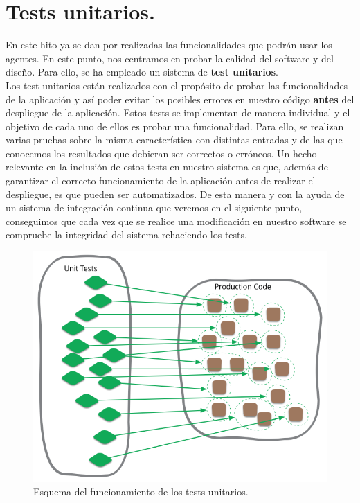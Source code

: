 \section{Tests unitarios.}\label{tests-section}

En este hito ya se dan por realizadas las funcionalidades que podrán usar los agentes. En este punto, nos centramos en probar la calidad del software y del diseño.
Para ello, se ha empleado un sistema de \textbf{test unitarios}.\\

Los test unitarios están realizados con el propósito de probar las funcionalidades de la aplicación y así poder evitar los posibles errores en nuestro código \textbf{antes}
del despliegue de la aplicación. Estos tests se implementan de manera individual y el objetivo de cada uno de ellos es probar una funcionalidad. Para ello, se realizan varias
pruebas sobre la misma característica con distintas entradas y de las que conocemos los resultados que debieran ser correctos o erróneos. Un hecho relevante en la inclusión
de estos tests en nuestro sistema es que, además de garantizar el correcto funcionamiento de la aplicación antes de realizar el despliegue, es que pueden ser automatizados. 
De esta manera y con la ayuda de un sistema de integración continua que veremos en el siguiente punto, conseguimos que cada vez que se realice una modificación en nuestro software
se compruebe la integridad del sistema rehaciendo los tests.\\

\begin{figure}[H]
	\centering
	\includegraphics[scale=0.45]{imagenes/unit-test.png}
	\caption{Esquema del funcionamiento de los tests unitarios.\cite{image-unit-test}}
\end{figure}

